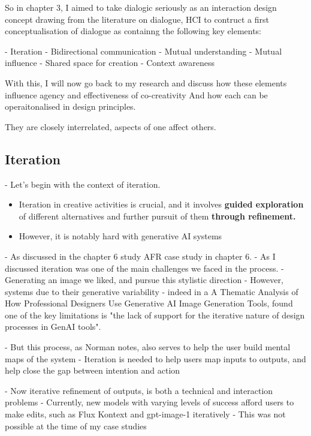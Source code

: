 So in chapter 3, I aimed to take dialogic seriously as an interaction design concept drawing from the literature on dialogue, HCI to contruct a first conceptualisation of dialogue as containng the following key elements: 

- Iteration
- Bidirectional communication
- Mutual understanding 
- Mutual influence 
- Shared space for creation 
- Context awareness 

With this, I will now go back to my research and discuss how these elements influence agency and effectiveness of co-creativity
And how each can be operaitonalised in design principles. 

They are closely interrelated, aspects of one affect others. 

\subsection{Iteration}

- Let's begin with the context of iteration. 
\begin{itemize}
    \item Iteration in creative activities is crucial, and it involves \textbf{guided exploration} of different alternatives and further pursuit of them \textbf{through refinement.} 
    \item However, it is notably hard with generative AI systems
\end{itemize}
- As discussed in the chapter 6 study AFR case study in chapter 6.
- As I discussed iteration was one of the main challenges we faced in the process. 
- Generating an image we liked, and pursue this stylistic direction
- However, systems due to their generative variability 
- indeed \cite{Park2024-gw} in a A Thematic
Analysis of How Professional Designers Use Generative AI Image Generation Tools, found one of the key limitations is "the lack of support for the iterative nature of design processes in GenAI tools". 

- But this process, as Norman notes, also serves to help the user build mental maps of the system
- Iteration is needed to help users map inputs to outputs, and help close the gap between intention and action

- Now iterative refinement of outputs, is both a technical and interaction problems
- Currently, new models with varying levels of success afford users to make edits, such as Flux Kontext and gpt-image-1 iteratively
- This was not possible at the time of my case studies


